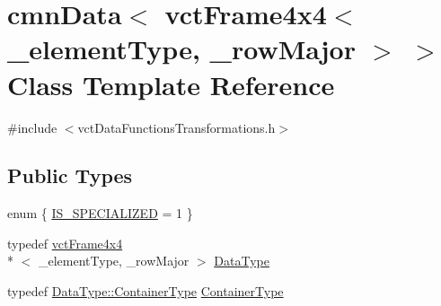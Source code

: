 \hypertarget{classcmn_data_3_01vct_frame4x4_3_01__element_type_00_01__row_major_01_4_01_4}{\section{cmn\-Data$<$ vct\-Frame4x4$<$ \-\_\-element\-Type, \-\_\-row\-Major $>$ $>$ Class Template Reference}
\label{classcmn_data_3_01vct_frame4x4_3_01__element_type_00_01__row_major_01_4_01_4}
}


{\ttfamily \#include $<$vct\-Data\-Functions\-Transformations.\-h$>$}

\subsection*{Public Types}
\begin{DoxyCompactItemize}
\item 
enum \{ \hyperlink{classcmn_data_3_01vct_frame4x4_3_01__element_type_00_01__row_major_01_4_01_4_abb61e8644a515ceda547cfa5509bee9fab636969b812f98e416dafe8de3caa814}{I\-S\-\_\-\-S\-P\-E\-C\-I\-A\-L\-I\-Z\-E\-D} = 1
 \}
\item 
typedef \hyperlink{classvct_frame4x4}{vct\-Frame4x4}\\*
$<$ \-\_\-element\-Type, \-\_\-row\-Major $>$ \hyperlink{classcmn_data_3_01vct_frame4x4_3_01__element_type_00_01__row_major_01_4_01_4_abf4e17a9d0af654027bedb454326d1d2}{Data\-Type}
\item 
typedef \hyperlink{classvct_frame4x4_a3174a2ddafc9ae2b74009bab0c2b47c4}{Data\-Type\-::\-Container\-Type} \hyperlink{classcmn_data_3_01vct_frame4x4_3_01__element_type_00_01__row_major_01_4_01_4_ae99fda61ec4aed99e356a16b3fdbf448}{Container\-Type}
\end{DoxyCompactItemize}
